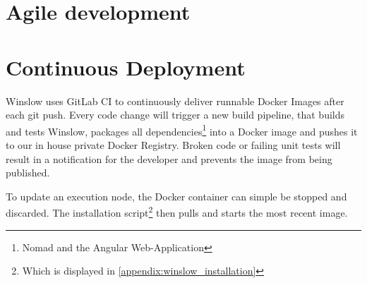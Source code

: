 \section{Agile development}



\section{Continuous Deployment}

Winslow uses GitLab CI to continuously deliver runnable Docker Images after each git push.
Every code change will trigger a new build pipeline, that builds and tests Winslow, packages all dependencies\footnote{Nomad and the Angular Web-Application} into a Docker image and pushes it to our in house private Docker Registry.
Broken code or failing unit tests will result in a notification for the developer and prevents the image from being published.

To update an execution node, the Docker container can simple be stopped and discarded.
The installation script\footnote{Which is displayed in \autoref{appendix:winslow_installation}} then pulls and starts the most recent image.